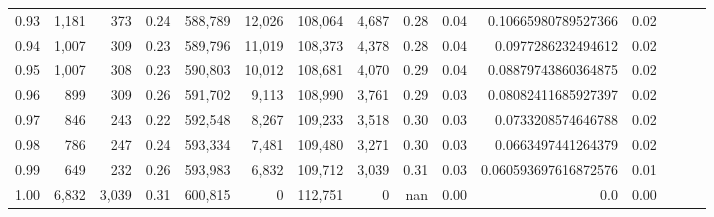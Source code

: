 \begin{tabular}{rrrrrrrrrrrrrrr}
0.93 &   1,181 &    373 &  0.24 &  588,789 &   12,026 &  108,064 &    4,687 &  0.28 &  0.04 &   0.10665980789527366 &      0.02 \\
0.94 &   1,007 &    309 &  0.23 &  589,796 &   11,019 &  108,373 &    4,378 &  0.28 &  0.04 &    0.0977286232494612 &      0.02 \\
0.95 &   1,007 &    308 &  0.23 &  590,803 &   10,012 &  108,681 &    4,070 &  0.29 &  0.04 &   0.08879743860364875 &      0.02 \\
0.96 &     899 &    309 &  0.26 &  591,702 &    9,113 &  108,990 &    3,761 &  0.29 &  0.03 &   0.08082411685927397 &      0.02 \\
0.97 &     846 &    243 &  0.22 &  592,548 &    8,267 &  109,233 &    3,518 &  0.30 &  0.03 &    0.0733208574646788 &      0.02 \\
0.98 &     786 &    247 &  0.24 &  593,334 &    7,481 &  109,480 &    3,271 &  0.30 &  0.03 &    0.0663497441264379 &      0.02 \\
0.99 &     649 &    232 &  0.26 &  593,983 &    6,832 &  109,712 &    3,039 &  0.31 &  0.03 &  0.060593697616872576 &      0.01 \\
1.00 &   6,832 &  3,039 &  0.31 &  600,815 &        0 &  112,751 &        0 &   nan &  0.00 &                   0.0 &      0.00 \\
\bottomrule
\end{tabular}
